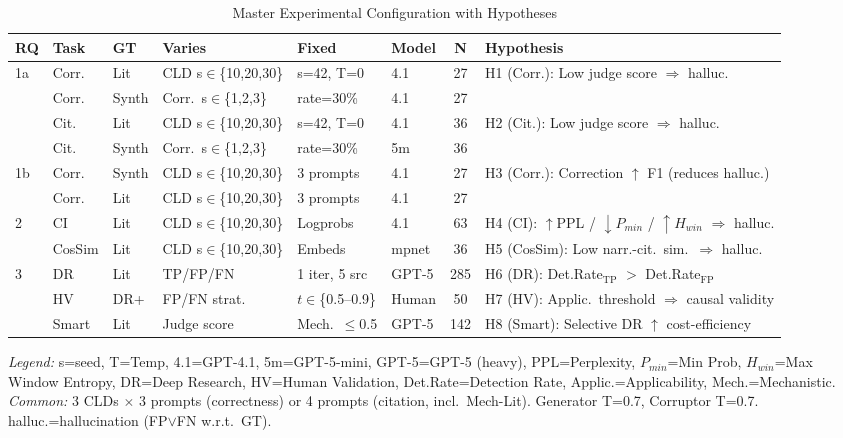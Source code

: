 \begin{table}[H]
\centering
\caption{Master Experimental Configuration with Hypotheses}
\label{tab:master}
\scriptsize
\renewcommand{\arraystretch}{1.2}
\begin{tabularx}{\textwidth}{@{}l l l l l l c X@{}}
\toprule
\textbf{RQ} & \textbf{Task} & \textbf{GT} & \textbf{Varies} & \textbf{Fixed} & \textbf{Model} & \textbf{N} & \textbf{Hypothesis} \\
\midrule
\multirow{4}{*}{1a} 
  & Corr. & Lit & CLD s$\in$\{10,20,30\} & s=42, T=0 & 4.1 & 27 & \multirow{2}{*}{H1 (Corr.): Low judge score $\Rightarrow$ halluc.} \\
  & Corr. & Synth & Corr.\ s$\in$\{1,2,3\} & rate=30\% & 4.1 & 27 & \\
  & Cit. & Lit & CLD s$\in$\{10,20,30\} & s=42, T=0 & 4.1 & 36 & \multirow{2}{*}{H2 (Cit.): Low judge score $\Rightarrow$ halluc.} \\
  & Cit. & Synth & Corr.\ s$\in$\{1,2,3\} & rate=30\% & 5m & 36 & \\
\midrule
\multirow{2}{*}{1b}
  & Corr. & Synth & CLD s$\in$\{10,20,30\} & 3 prompts & 4.1 & 27 & \multirow{2}{*}{H3 (Corr.): Correction $\uparrow$ F1 (reduces halluc.)} \\
  & Corr. & Lit & CLD s$\in$\{10,20,30\} & 3 prompts & 4.1 & 27 & \\
\midrule
\multirow{2}{*}{2}
  & CI & Lit & CLD s$\in$\{10,20,30\} & Logprobs & 4.1 & 63 & H4 (CI): $\uparrow$PPL / $\downarrow P_{min}$ / $\uparrow H_{win}$ $\Rightarrow$ halluc. \\
  & CosSim & Lit & CLD s$\in$\{10,20,30\} & Embeds & mpnet & 36 & H5 (CosSim): Low narr.-cit.\ sim.\ $\Rightarrow$ halluc. \\
\midrule
\multirow{3}{*}{3}
  & DR & Lit & TP/FP/FN & 1 iter, 5 src & GPT-5 & 285 & H6 (DR): Det.Rate$_{\text{TP}}$ $>$ Det.Rate$_{\text{FP}}$ \\
  & HV & DR+ & FP/FN strat. & $t\in$\{0.5--0.9\} & Human & 50 & H7 (HV): Applic.\ threshold $\Rightarrow$ causal validity \\
  & Smart & Lit & Judge score & Mech.\ $\leq$0.5 & GPT-5 & 142 & H8 (Smart): Selective DR $\uparrow$ cost-efficiency \\
\bottomrule
\end{tabularx}
\vspace{0.3em}

\scriptsize
\textit{Legend:} s=seed, T=Temp, 4.1=GPT-4.1, 5m=GPT-5-mini, GPT-5=GPT-5 (heavy), PPL=Perplexity, $P_{min}$=Min Prob, $H_{win}$=Max Window Entropy, DR=Deep Research, HV=Human Validation, Det.Rate=Detection Rate, Applic.=Applicability, Mech.=Mechanistic. \\
\textit{Common:} 3 CLDs $\times$ 3 prompts (correctness) or 4 prompts (citation, incl.\ Mech-Lit). Generator T=0.7, Corruptor T=0.7. halluc.=hallucination (FP$\lor$FN w.r.t.\ GT).
\end{table}

